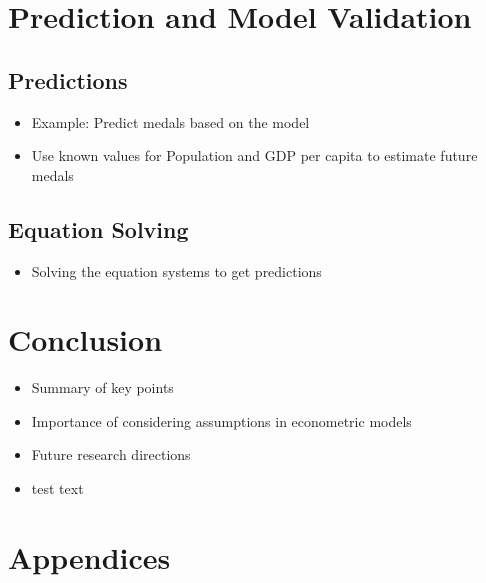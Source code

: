 \documentclass[
]{article}
\providecommand{\tightlist}{%
  \setlength{\itemsep}{0pt}\setlength{\parskip}{0pt}}
\begin{document}
\hypertarget{prediction-and-model-validation}{%
\section{Prediction and Model
Validation}\label{prediction-and-model-validation}}

\hypertarget{predictions}{%
\subsection{Predictions}\label{predictions}}

\begin{itemize}
\tightlist
\item
  Example: Predict medals based on the model
\item
  Use known values for Population and GDP per capita to estimate future
  medals
\end{itemize}

\hypertarget{equation-solving}{%
\subsection{Equation Solving}\label{equation-solving}}

\begin{itemize}
\tightlist
\item
  Solving the equation systems to get predictions
\end{itemize}

\hypertarget{conclusion}{%
\section{Conclusion}\label{conclusion}}

\begin{itemize}
\tightlist
\item
  Summary of key points
\item
  Importance of considering assumptions in econometric models
\item
  Future research directions
\item
  test text
\end{itemize}

\hypertarget{appendices}{%
\section{Appendices}\label{appendices}}
\end{document}

